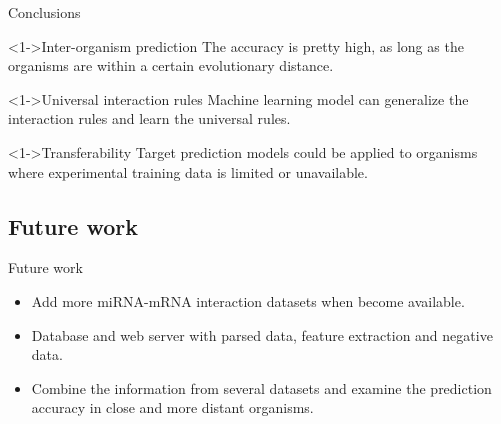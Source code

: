 \documentclass{beamer}
\begin{document}
 



\begin{frame}{Conclusions}
\begin{exampleblock}
		<1->{Inter-organism prediction}
The accuracy is pretty high, as long as the organisms are within a certain evolutionary distance.
\end{exampleblock}
\pause
\begin{exampleblock}
		<1->{Universal interaction rules}
Machine learning model can generalize the interaction rules and learn the universal  rules. 
\end{exampleblock}
\pause

\begin{exampleblock}
		<1->{Transferability}
Target prediction models could be applied to organisms where experimental training data is limited or unavailable.
\end{exampleblock}

\end{frame}




\subsection{Future work}
\begin{frame}{Future work}
\begin{itemize}
\item Add more miRNA-mRNA interaction datasets when become available.
\item Database and web server with parsed data, feature extraction and negative data.
\item Combine the information from several datasets and examine the prediction accuracy in close and more distant organisms.
\end{itemize}
\end{frame}
\end{document}
